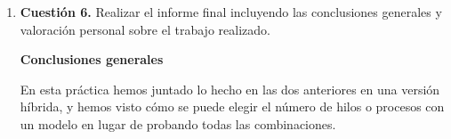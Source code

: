 \documentclass[12pt]{article}
\begin{document}
\begin{enumerate}
\[
p_{opt} \approx 13.29 \;\rightarrow\; 13 \text{ procesos}, \qquad t(p_{opt}) \approx 6.47 \text{ s}
\]

Experimentalmente, el menor tiempo se obtiene con 10 procesos (6.20 s). La diferencia está en la zona plana de la curva: con 12 y 14 procesos el tiempo real es 6.40 y 6.58 s, a menos de 0.4 s del mínimo. Así que el modelo no da exactamente el mejor número de procesos, pero sí indica que no compensa pasar de unos 10--14 procesos en este sistema, y equivocarse dentro de ese rango apenas cambia el tiempo.




\newpage
\item \textbf{Cuestión 6.} Realizar el informe final incluyendo las conclusiones generales y valoración personal sobre el trabajo realizado.



\medskip
\noindent\textbf{Conclusiones generales}\par
\smallskip

En esta práctica hemos juntado lo hecho en las dos anteriores en una versión híbrida, y hemos visto cómo se puede elegir el número de hilos o procesos con un modelo en lugar de probando todas las combinaciones.


\end{enumerate}
\end{document}
